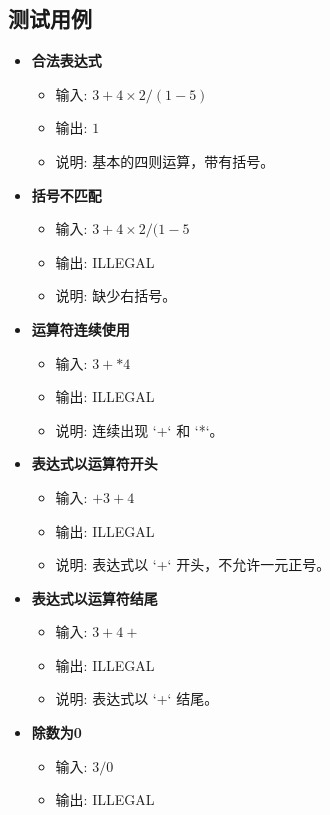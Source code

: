 \documentclass{article}
\begin{document}
\subsection{测试用例}
\begin{itemize}
    \item \textbf{合法表达式}
    \begin{itemize}
        \item 输入: \(3 + 4 \times 2 / ( 1 - 5 )\)
        \item 输出: \(1\)
        \item 说明: 基本的四则运算，带有括号。
    \end{itemize}
    \item \textbf{括号不匹配}
    \begin{itemize}
        \item 输入: \(3 + 4 \times 2 / ( 1 - 5\)
        \item 输出: ILLEGAL
        \item 说明: 缺少右括号。
    \end{itemize}
    \item \textbf{运算符连续使用}
    \begin{itemize}
        \item 输入: \(3 + * 4\)
        \item 输出: ILLEGAL
        \item 说明: 连续出现 `+` 和 `*`。
    \end{itemize}
    \item \textbf{表达式以运算符开头}
    \begin{itemize}
        \item 输入: \(+ 3 + 4\)
        \item 输出: ILLEGAL
        \item 说明: 表达式以 `+` 开头，不允许一元正号。
    \end{itemize}
    \item \textbf{表达式以运算符结尾}
    \begin{itemize}
        \item 输入: \(3 + 4 +\)
        \item 输出: ILLEGAL
        \item 说明: 表达式以 `+` 结尾。
    \end{itemize}
    \item \textbf{除数为0}
    \begin{itemize}
        \item 输入: \(3 / 0\)
        \item 输出: ILLEGAL

\end{itemize}
\end{itemize}
\end{document}
